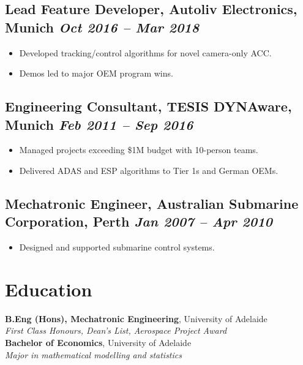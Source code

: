 \documentclass[10pt,a4paper]{article}
\begin{document}
\subsection*{Lead Feature Developer, Autoliv Electronics, Munich \hfill \textit{Oct 2016 – Mar 2018}}
\begin{itemize}
    \item Developed tracking/control algorithms for novel camera-only ACC.
    \item Demos led to major OEM program wins.
\end{itemize}

\subsection*{Engineering Consultant, TESIS DYNAware, Munich \hfill \textit{Feb 2011 – Sep 2016}}
\begin{itemize}
    \item Managed projects exceeding \$1M budget with 10-person teams.
    \item Delivered ADAS and ESP algorithms to Tier 1s and German OEMs.
\end{itemize}

\subsection*{Mechatronic Engineer, Australian Submarine Corporation, Perth \hfill \textit{Jan 2007 – Apr 2010}}
\begin{itemize}
    \item Designed and supported submarine control systems.
\end{itemize}

\vspace{1.2em}

\section*{Education}

\textbf{B.Eng (Hons), Mechatronic Engineering}, University of Adelaide \\
\textit{First Class Honours, Dean's List, Aerospace Project Award} \\[4pt]
\textbf{Bachelor of Economics}, University of Adelaide \\
\textit{Major in mathematical modelling and statistics}

\vspace{1.2em}
\end{document}
